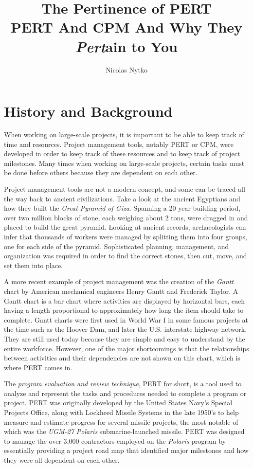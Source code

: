 \documentclass[12pt]{article}
\title{The Pertinence of PERT \\[0.25in]
  \small PERT And CPM And Why They \textit{Pert}ain to You}
\author{Nicolas Nytko}
\begin{document}
\maketitle
\newpage

\doublespacing

\section{History and Background}
When working on large-scale projects, it is important to be able to keep track of time and resources.
Project management tools, notably PERT or CPM, were developed in order to keep track of these resources and to keep track of project milestones.
Many times when working on large-scale projects, certain tasks must be done before others because they are dependent on each other.

Project management tools are not a modern concept, and some can be traced all the way back to ancient civilizations.  Take a look at the ancient Egyptians and how they built the \textit{Great Pyramid of Giza}.  Spanning a 20 year building period, over two million blocks of stone, each weighing about 2 tons, were dragged in and placed to build the great pyramid.  Looking at ancient records, archaeologists can infer that thousands of workers were managed by splitting them into four groups, one for each side of the pyramid.  Sophisticated planning, management, and organization was required in order to find the correct stones, then cut, move, and set them into place.

A more recent example of project management was the creation of the \textit{Gantt} chart by American mechanical engineers Henry Gantt and Frederick Taylor.
A Gantt chart is a bar chart where activities are displayed by horizontal bars, each having a length proportional to approximately how long the item should take to complete.
Gantt charts were first used in World War I in some famous projects at the time such as the Hoover Dam, and later the U.S. interstate highway network.
They are still used today because they are simple and easy to understand by the entire workforce.
However, one of the major shortcomings is that the relationships between activities and their dependencies are not shown on this chart, which is where PERT comes in.

The \textit{program evaluation and review technique}, PERT for short, is a tool used to analyze and represent the tasks and procedures needed to complete a program or project.
PERT was originally developed by the United States Navy's Special Projects Office, along with Lockheed Missile Systems in the late 1950's to help measure and estimate progress for several missile projects, the most notable of which was the \textit{UGM-27 Polaris} submarine-launched missile.
PERT was designed to manage the over 3,000 contractors employed on the \textit{Polaris} program by essentially providing a project road map that identified major milestones and how they were all dependent on each other.
\end{document}
